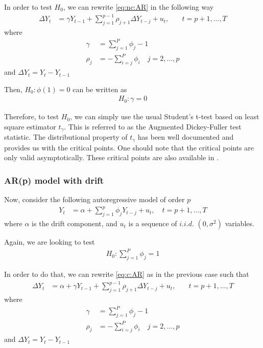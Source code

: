 \documentclass[11pt]{article}\usepackage[]{graphicx}\usepackage[]{color}
\begin{document}
In order to test $H_0$, we can rewrite \ref{eq:nc:AR} in the following way
\begin{align}
	\Delta Y_t & = \gamma Y_{t-1} + \sum_{j=1}^{p-1}\rho_{j+1}\Delta Y_{t-j} + u_t, & \quad t = p + 1, ... , T
\end{align}
where
\begin{align}
	\gamma & =\sum_{j=1}^{P} \phi_{j} -1 \\
	\rho_j & = - \sum_{i=j}^{P} \phi_{i} \quad j = 2,...,p
\end{align}
and $\Delta Y_t= Y_{t}-Y_{t-1}$

Then, $H_0: \phi(1)=0$ can be written as
\begin{align}
	H_0: \gamma=0
\end{align}

Therefore, to test $H_0$, we can simply use the usual Student's t-test based on least square estimator $t_\gamma$. This is referred to as the Augmented Dickey-Fuller test statistic. The distributional property of $t_\gamma$ has been well documented and \cite[Table 8.5.2, $n=\infty$]{fuller_introduction_1976} provides us with the critical points. One should note that the critical points are only valid asymptotically. These critical points are also available in \cite{banerjee_co-integration_1993}.

\subsubsection{AR(p) model with drift}

Now, consider the following autoregressive model of order $p$
\begin{align}
	\label{eq:c:AR}
	Y_t & = \alpha + \sum_{j=1}^{p} \phi_j Y_{t-j} + u_t, \quad t = p + 1, ... , T
\end{align}
where $\alpha$ is the drift component, and $u_t$ is a sequence of $i.i.d.$ $(0,\sigma^2)$ variables.

Again, we are looking to test
\begin{align}
	H_0: \sum_{j=1}^{P} \phi_{j} = 1
\end{align}

In order to do that, we can rewrite \ref{eq:c:AR} as in the previous case such that
\begin{align}
	\Delta Y_t & =  \alpha + \gamma Y_{t-1} + \sum_{j=1}^{p-1}\rho_{j+1}\Delta Y_{t-j} + u_t, & \quad t = p + 1, ... , T
\end{align}
where
\begin{align}
	\gamma & =\sum_{j=1}^{P} \phi_{j} -1 \\
	\rho_j & = - \sum_{i=j}^{P} \phi_{i} \quad j = 2,...,p
\end{align}
and $\Delta Y_t= Y_{t}-Y_{t-1}$
\end{document}
